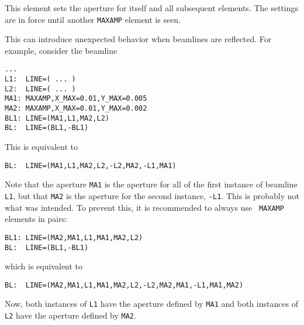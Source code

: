 This element sets the aperture for itself and all subsequent elements.
The settings are in force until another {\tt MAXAMP} element is seen.

This can introduce unexpected behavior when beamlines are reflected.
For example, consider the beamline
\begin{verbatim}
...
L1:  LINE=( ... )
L2:  LINE=( ... )
MA1: MAXAMP,X_MAX=0.01,Y_MAX=0.005
MA2: MAXAMP,X_MAX=0.01,Y_MAX=0.002
BL1: LINE=(MA1,L1,MA2,L2)
BL:  LINE=(BL1,-BL1)
\end{verbatim}

This is equivalent to
\begin{verbatim}
BL:  LINE=(MA1,L1,MA2,L2,-L2,MA2,-L1,MA1)
\end{verbatim}
Note that the aperture {\tt MA1} is the aperture for all of the first
instance of beamline {\tt L1}, but that {\tt MA2} is the aperture for
the second instance, {\tt -L1}.  This is probably not what was
intended.  To prevent this, it is recommended to always use {\tt
MAXAMP} elements in pairs:
\begin{verbatim}
BL1: LINE=(MA2,MA1,L1,MA1,MA2,L2)
BL:  LINE=(BL1,-BL1)
\end{verbatim}
which is equivalent to
\begin{verbatim}
BL:  LINE=(MA2,MA1,L1,MA1,MA2,L2,-L2,MA2,MA1,-L1,MA1,MA2)
\end{verbatim}
Now, both instances of {\tt L1} have the aperture defined by 
{\tt MA1} and both instances of {\tt L2} have the aperture defined
by {\tt MA2}.

